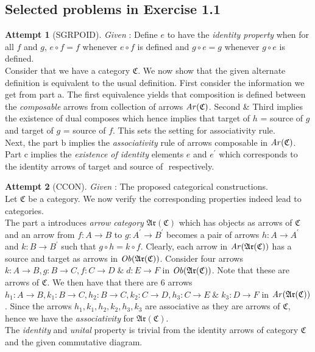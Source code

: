 \documentclass{article}
\theoremstyle{definition}
\theoremstyle{remark}
\theoremstyle{definition}
\theoremstyle{definition}
\theoremstyle{definition}
\newtheorem*{attempt}{Attempt}
\newcommand{\cat}[1]{\mathfrak{#1}}
\newcommand{\obj}[1]{\text{\textit{Ob}}(#1)}
\newcommand{\arr}[1]{\text{\textit{Ar}}(#1)}
\begin{document}
\subsection{Selected problems in Exercise 1.1}  
\begin{attempt}[SGRPOID]
	\textit{Given} : Define $ e $ to have the \emph{identity property} when for all $ f$ and $ g $, $ e\circ f =  f $ whenever $ e\circ f $ is defined and $ g\circ e = g $ whenever $ g\circ e $ is defined. \\
	Consider that we have a category $ \cat{C} $. We now show that the given alternate definition is equivalent to the usual definition. First consider the information we get from part a. The first equivalence yields that composition is defined between the \textit{composable} arrows from collection of arrows $ \arr{\cat{C}} $. Second \& Third implies the existence of dual composes which hence implies that target of $ h$ = source of $ g $ and target of $ g $ = source of $ f $. This sets the setting for associativity rule.\\
	Next, the part b implies the \textit{associativity} rule of arrows composable in $ \arr{\cat{C}} $.\\
	Part c implies the \textit{existence of identity} elements $ e $ and $ e^\prime $ which corresponds to the identity arrows of target and source of $ $ respectively.
\end{attempt}
\begin{attempt}[CCON]
	\label{CCON}
	\textit{Given} : The proposed categorical constructions.\\
Let $ \cat{C} $ be a category. We now verify the corresponding properties indeed lead to categories.\\
The part a introduces \textit{arrow category} $ \cat{Ar}(\cat{C})$ which has objects as arrows of $ \cat{C} $ and an arrow from $ f :A\to B $ to $ g:A^\prime \to B^\prime $ becomes a pair of arrows $ h:A\to A^\prime $ and $ k : B\to B^\prime $ such that $ g\circ h  = k\circ f$. Clearly, each arrow in $ \arr{\cat{Ar}(\cat{C})} $ has a source and target as arrows in $ \obj{\cat{Ar}(\cat{C})} $. Consider four arrows $ k:A\to B , g:B\to C, f:C\to D\;\&\; d:E\to F$ in $ \obj{\cat{Ar}(\cat{C})} $. Note that these are arrows of $ \cat{C} $. We then have that there are 6 arrows $ h_1:A\to B, k_1 : B\to C, h_2: B\to C, k_2:C\to D, h_3 : C\to E\;\& \; k_3 : D\to F $ in $ \arr{\cat{Ar}(\cat{C})} $. Since the arrows $ h_1,k_1,h_2,k_2,h_3,k_3 $ are associative as they are arrows of $ \cat{C} $, hence we have the \textit{associativity} for $ \cat{Ar}(\cat{C}) $.\\
The \textit{identity} and \textit{unital} property is trivial from the identity arrows of category $ \cat{C} $ and the given commutative diagram.
\end{attempt}
\hrulefill
\newpage
\end{document}
